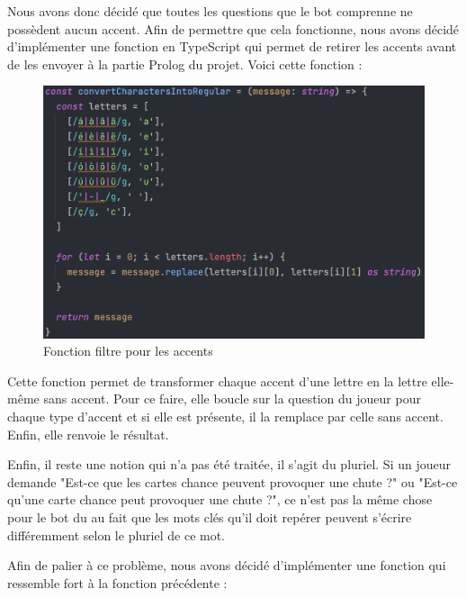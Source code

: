 \documentclass[a4paper, 11pt]{article}
\begin{document}
Nous avons donc décidé que toutes les questions que le bot comprenne ne possèdent aucun accent. Afin de permettre que cela fonctionne, nous avons décidé d'implémenter une fonction en TypeScript qui permet de retirer les accents avant de les envoyer à la partie Prolog du projet. Voici cette fonction :

\begin{figure}[!h]
	\centering
	\includegraphics[scale=.6]{assets/fonction-accent.png}
	\caption{Fonction filtre pour les accents}
\end{figure}

\newpage

Cette fonction permet de transformer chaque accent d'une lettre en la lettre elle-même sans accent. Pour ce faire, elle boucle sur la question du joueur pour chaque type d'accent et si elle est présente, il la remplace par celle sans accent. Enfin, elle renvoie le résultat.\newline

Enfin, il reste une notion qui n'a pas été traitée, il s'agit du pluriel. Si un joueur demande "Est-ce que les cartes chance peuvent provoquer une chute ?" ou "Est-ce qu'une carte chance peut provoquer une chute ?", ce n'est pas la même chose pour le bot du au fait que les mots clés qu'il doit repérer peuvent s'écrire différemment selon le pluriel de ce mot.\newline

Afin de palier à ce problème, nous avons décidé d'implémenter une fonction qui ressemble fort à la fonction précédente : 
\end{document}
